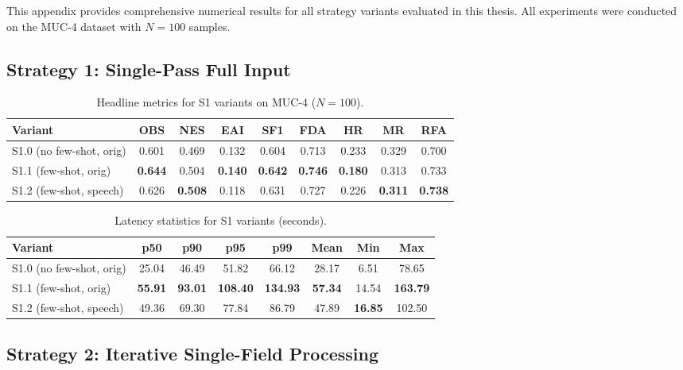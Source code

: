 This appendix provides comprehensive numerical results for all strategy variants evaluated in this thesis. All experiments were conducted on the MUC-4 dataset with $N=100$ samples.

\subsection{Strategy 1: Single-Pass Full Input}
\label{appendix:s1-results}

\begin{table}[H]
 \centering
\caption{Headline metrics for S1 variants on MUC-4 ($N{=}100$).}
\label{tab:s1-variants-headline}
\begin{tabular}{lcccccccc}
\toprule
 Variant & OBS & NES & EAI & SF1 & FDA & HR & MR & RFA \\
\midrule
 S1.0 (no few-shot, orig) & 0.601 & 0.469 & 0.132 & 0.604 & 0.713 & 0.233 & 0.329 & 0.700 \\
 S1.1 (few-shot, orig) & \textbf{0.644} & 0.504 & \textbf{0.140} & \textbf{0.642} & \textbf{0.746} & \textbf{0.180} & 0.313 & 0.733 \\
 S1.2 (few-shot, speech) & 0.626 & \textbf{0.508} & 0.118 & 0.631 & 0.727 & 0.226 & \textbf{0.311} & \textbf{0.738} \\
\bottomrule
\end{tabular}
\end{table}

\begin{table}[H]
 \centering
\caption{Latency statistics for S1 variants (seconds).}
\label{tab:s1-latency-all}
\begin{tabular}{lccccccc}
\toprule
 Variant & p50 & p90 & p95 & p99 & Mean & Min & Max \\
\midrule
 S1.0 (no few-shot, orig) & 25.04 & 46.49 & 51.82 & 66.12 & 28.17 & 6.51 & 78.65 \\
 S1.1 (few-shot, orig) & \textbf{55.91} & \textbf{93.01} & \textbf{108.40} & \textbf{134.93} & \textbf{57.34} & 14.54 & \textbf{163.79} \\
 S1.2 (few-shot, speech) & 49.36 & 69.30 & 77.84 & 86.79 & 47.89 & \textbf{16.85} & 102.50 \\
\bottomrule
\end{tabular}
\end{table}

\subsection{Strategy 2: Iterative Single-Field Processing}
\label{appendix:s2-results}


